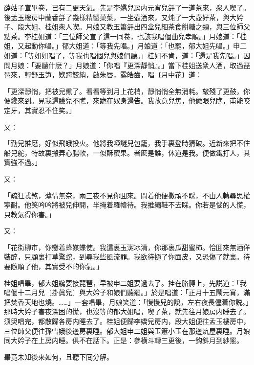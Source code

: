 薛姑子宣畢卷，已有二更天氣。先是李嬌兒房内元宵兒㧱了一道茶來，衆人喫了。後孟玉樓房中蘭香㧱了幾樣精製菓菜，一坐壺酒來，又炖了一大壺好茶，與大妗子、段大姐、桂姐衆人喫。月娘又教玉簫㧱出四盒兒細茶食餅糖之類，與三位師父點茶。李桂姐道：「三位師父宣了這一囘卷，也該我唱個曲兒孝順。」月娘道：「桂姐，又起動你唱。」郁大姐道：「等我先唱。」月娘道：「也罷，郁大姐先唱。」申二姐道：「等姐姐唱了，等我也唱個兒與娘們聽。」桂姐不肯，道：「還是我先唱。」因問月娘：「要聽什麽？」月娘道：「你唱『更深靜悄』。」當下桂姐送衆人酒，取過琵琶來，輕舒玉笋，欵跨鮫綃，啟朱唇，露皓齒，唱〔月中花〕道：

\begin{myquote}
「更深靜悄，把被兒熏了。看看等到月上花梢，靜悄悄全無消耗。敲殘了更鼓，你便纔來到。見我這臉兒不瞧，來跪在奴身邊告。我故意兒焦，他偸眼兒瞧，甫能咬定牙，其實忍不住笑。」
\end{myquote}

又：

\begin{myquote}
「勤兒推磨，好似飛蛾投火。他將我啞謎兒包籠，我手裏登時猜破。近新來把不住船兒舵，特故裏搬弄心腸軟，一似酥蜜果。者麽是誰，休道是我。便做鐵打人，其實強不過。」
\end{myquote}

又：

\begin{myquote}
「疏狂忒煞，薄情無奈，兩三夜不見你囬來。問着他便撒頑不睬，不由人轉尋思權寜耐。他笑吟吟將被兒伸開，半掩着羅幃待。我推繡鞋不去睬。你若是惱的人慌，只教氣得你害。」
\end{myquote}

又：

\begin{myquote}
「花街柳市，你戀着蜂媒蝶使。我這裏玉潔冰清，你那裏瓜甜蜜柿。恰囬來無酒佯裝醉，只顧裏打草驚蛇，到尋我些風流罪。我欲待撾了你面皮，又恐傷了就裏。待要隨順了他，其實受不的你氣。」
\end{myquote}

桂姐唱畢，郁大姐纔要接琵琶，早被申二姐要過去了。挂在胳膊上，先説道：「我唱個十二月兒〔掛眞兒〕與大妗子和娘們聽罷。」於是唱道：「正月十五鬧元宵，滿把焚香天地也燒。……」一套唱畢，月娘笑道：「慢慢兒的說，左右夜長儘着你説。」那時大妗子害夜深困的慌，也沒等的郁大姐唱，喫了茶，就先往月娘房内睡去了。须臾唱完，都散歸各房内睡去了。桂姐便歸李嬌兒房内，段大姐便往孟玉樓房中，三位師父便往孫雪娥後邊房裏睡。郁大姐申二姐與玉簫小玉在那邊炕屋裏睡。月娘同大妗子在上房内睡。俱不在話下。正是：參横斗轉三更後，一鈎斜月到紗窻。

畢竟未知後來如何，且聽下囘分解。

\theendnotes

